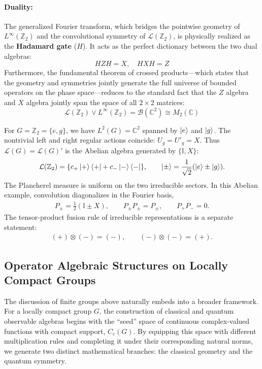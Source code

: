 \documentclass[11pt]{article}
\begin{document}
\paragraph{Duality:} The generalized Fourier transform, which bridges the pointwise geometry of $L^\infty(\mathbb{Z}_2)$ and the convolutional symmetry of $\mathcal{L}(\mathbb{Z}_2)$, is physically realized as the \textbf{Hadamard gate} ($H$). It acts as the perfect dictionary between the two dual algebras:
\begin{equation}
    H Z H = X, \quad H X H = Z
\end{equation}
Furthermore, the fundamental theorem of crossed products---which states that the geometry and symmetries jointly generate the full universe of bounded operators on the phase space---reduces to the standard fact that the $Z$ algebra and $X$ algebra jointly span the space of all $2 \times 2$ matrices:
\begin{equation}
    \mathcal{L}(\mathbb{Z}_2) \vee L^\infty(\mathbb{Z}_2) = \mathcal{B}(\mathbb{C}^2) \cong M_2(\mathbb{C})
\end{equation}

For $G=\mathbb{Z}_2=\{e,g\}$, we have $L^2(G)=\mathbb C^2$ spanned by
$\ket e$ and $\ket g$. The nontrivial left and right regular actions coincide:
$U_g=U'_g=X$. Thus $\mathcal L(G)=\mathcal L(G)'$ is the Abelian algebra
generated by $\{\mathbb I,X\}$:
\begin{align}
    \mathcal L(\mathbb Z_2)
    =\{c_+\ket{+}\bra{+}+c_-\ket{-}\bra{-}\},
    \qquad
    \ket{\pm}=\frac{1}{\sqrt 2}(\ket e\pm\ket g).
\end{align}
The Plancherel measure is uniform on the two irreducible sectors. In this
Abelian example, convolution diagonalizes in the Fourier basis,
\begin{align}
    P_\pm=\frac{1}{2}(\mathbb I\pm X),\qquad
    P_\pm P_\pm=P_\pm,\qquad P_+P_-=0.
\end{align}
The tensor-product fusion rule of irreducible representations is a separate
statement:
\begin{align}
    (+)\otimes(-)=(-),\qquad
    (-)\otimes(-)=(+).
\end{align}

\subsection{Operator Algebraic Structures on Locally Compact Groups}

The discussion of finite groups above naturally embeds into a broader framework. For a locally compact group $G$, the construction of classical and quantum observable algebras begins with the ``seed'' space of continuous complex-valued functions with compact support, $C_c(G)$. By equipping this space with different multiplication rules and completing it under their corresponding natural norms, we generate two distinct mathematical branches: the classical geometry and the quantum symmetry.
\end{document}

